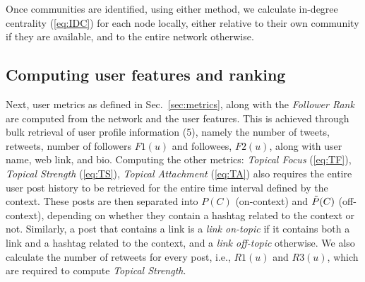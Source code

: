%



Once communities are identified, using either method, we calculate  in-degree centrality (\ref{eq:IDC}) for each node locally, either relative to their own community if they are available, and to the entire network otherwise.

\subsection{Computing user features and ranking} \label{sec:features}

Next, user metrics as defined in Sec.~\ref{sec:metrics}, along with the \textit{Follower Rank} are computed from the network and the user features.
%
This is achieved through bulk retrieval of user profile information (5), namely the number of tweets, retweets,  number of followers $F1(u)$ and followees, $F2(u)$, along with user name, web link, and bio.
%
Computing the other metrics: \textit{Topical Focus} (\ref{eq:TF}), \textit{Topical Strength} (\ref{eq:TS}), \textit{Topical Attachment} (\ref{eq:TA}) also requires the entire user post history to be retrieved for the entire time interval defined by the context.
These posts are then separated into $P(C)$ (on-context) and $\Tilde{P}(C)$ (off-context), depending on whether they contain a hashtag related to the context or not.
Similarly, a post that contains a link is a \textit{link on-topic} if it contains both a link and a hashtag related to the context, and a \textit{link off-topic} otherwise.
We also calculate the number of retweets for every post, i.e., $\mathit{R1}(u)$ and $\mathit{R3}(u)$, which are required to compute \textit{Topical Strength}.

